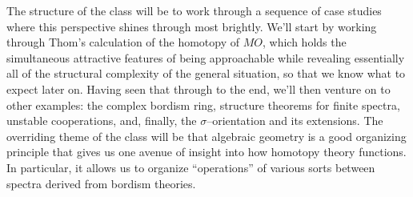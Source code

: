 The structure of the class will be to work through a sequence of case studies where this perspective shines through most brightly.  We'll start by working through Thom's calculation of the homotopy of $MO$, which holds the simultaneous attractive features of being approachable while revealing essentially all of the structural complexity of the general situation, so that we know what to expect later on.  Having seen that through to the end, we'll then venture on to other examples: the complex bordism ring, structure theorems for finite spectra, unstable cooperations, and, finally, the $\sigma$--orientation and its extensions.  The overriding theme of the class will be that algebraic geometry is a good organizing principle that gives us one avenue of insight into how homotopy theory functions.  In particular, it allows us to organize ``operations'' of various sorts between spectra derived from bordism theories.

